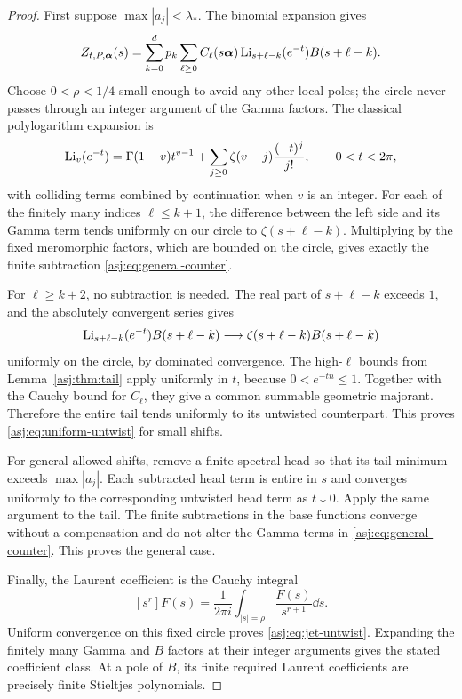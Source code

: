 \begin{proof}
First suppose $\max|a_j|<\lambda_*$. The binomial expansion gives
\[
 Z_{t,P,\boldsymbol\alpha}(s)
  =\sum_{k=0}^d p_k\sum_{\ell\ge0}C_\ell(s\boldsymbol\alpha)
          \operatorname{Li}_{s+\ell-k}(e^{-t}) B(s+\ell-k).
\]
Choose $0<\rho<1/4$ small enough to avoid any other local poles; the
circle never passes through an integer argument of the Gamma factors.
The classical polylogarithm expansion is \cite[Eq.~25.12.12]{dlmf-polylog}
\begin{equation}\label{asj:eq:Jonquiere}
 \operatorname{Li}_v(e^{-t})=\Gamma(1-v)t^{v-1}
                 +\sum_{j\ge0}\zeta(v-j)\frac{(-t)^j}{j!},
 \qquad 0<t<2\pi,
\end{equation}
with colliding terms combined by continuation when $v$ is an integer.
For each of the finitely many indices $\ell\le k+1$, the difference
between the left side and its Gamma term tends uniformly on our circle
to $\zeta(s+\ell-k)$. Multiplying by the fixed meromorphic factors,
which are bounded on the circle, gives exactly the finite subtraction
\eqref{asj:eq:general-counter}.

For $\ell\ge k+2$, no subtraction is needed. The real part of
$s+\ell-k$ exceeds $1$, and the absolutely convergent series gives
\[
 \operatorname{Li}_{s+\ell-k}(e^{-t})B(s+\ell-k)
    \longrightarrow \zeta(s+\ell-k)B(s+\ell-k)
\]
uniformly on the circle, by dominated convergence. The high-$\ell$
bounds from Lemma~\ref{asj:thm:tail} apply uniformly in $t$, because
$0<e^{-tn}\le1$. Together with the Cauchy bound for $C_\ell$, they give
a common summable geometric majorant. Therefore the entire tail tends
uniformly to its untwisted counterpart. This proves
\eqref{asj:eq:uniform-untwist} for small shifts.

For general allowed shifts, remove a finite spectral head so that its
tail minimum exceeds $\max|a_j|$. Each subtracted head term is entire
in $s$ and converges uniformly to the corresponding untwisted head term
as $t\downarrow0$. Apply the same argument to the tail. The finite
subtractions in the base functions converge without a compensation and
do not alter the Gamma terms in \eqref{asj:eq:general-counter}. This proves
the general case.

Finally, the Laurent coefficient is the Cauchy integral
\[
 [s^r]F(s)=\frac1{2\pi i}\int_{|s|=\rho}\frac{F(s)}{s^{r+1}}\dd s.
\]
Uniform convergence on this fixed circle proves
\eqref{asj:eq:jet-untwist}. Expanding the finitely many Gamma and $B$ factors
at their integer arguments gives the stated coefficient class. At a
pole of $B$, its finite required Laurent coefficients are precisely
finite Stieltjes polynomials.
\end{proof}

